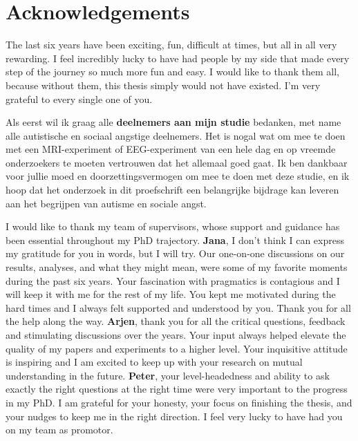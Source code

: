 \chapter*{Acknowledgements}
\label{ch:acknowledgements}

The last six years have been exciting, fun, difficult at times, but all in all very rewarding. I feel incredibly lucky to have had people by my side that made every step of the journey so much more fun and easy. I would like to thank them all, because without them, this thesis simply would not have existed. I'm very grateful to every single one of you.

Als eerst wil ik graag alle \textbf{deelnemers aan mijn studie} bedanken, met name alle autistische en sociaal angstige deelnemers. Het is nogal wat om mee te doen met een MRI-experiment of EEG-experiment van een hele dag en op vreemde onderzoekers te moeten vertrouwen dat het allemaal goed gaat. Ik ben dankbaar voor jullie moed en doorzettingsvermogen om mee te doen met deze studie, en ik hoop dat het onderzoek in dit proefschrift een belangrijke bijdrage kan leveren aan het begrijpen van autisme en sociale angst. 

I would like to thank my team of supervisors, whose support and guidance has been essential throughout my PhD trajectory. \newline 
\textbf{Jana}, I don't think I can express my gratitude for you in words, but I will try. Our one-on-one discussions on our results, analyses, and what they might mean, were some of my favorite moments during the past six years. Your fascination with pragmatics is contagious and I will keep it with me for the rest of my life. You kept me motivated during the hard times and I always felt supported and understood by you. Thank you for all the help along the way. \newline
\textbf{Arjen}, thank you for all the critical questions, feedback and stimulating discussions over the years. Your input always helped elevate the quality of my papers and experiments to a higher level. Your inquisitive attitude is inspiring and I am excited to keep up with your research on mutual understanding in the future. \newline
\textbf{Peter}, your level-headedness and ability to ask exactly the right questions at the right time were very important to the progress in my PhD. I am grateful for your honesty, your focus on finishing the thesis, and your nudges to keep me in the right direction. I feel very lucky to have had you on my team as promotor. 

